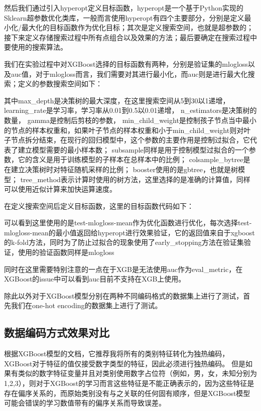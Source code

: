 然后我们通过引入hyperopt定义目标函数，hyperopt是一个基于Python实现的Sklearn超参数优化类库，一般而言使用hyperopt有四个主要部分，分别是定义最小化/最大化的目标函数作为优化目标；其次是定义搜索空间，也就是超参数的；接下来定义存储搜索过程中所有点组合以及效果的方法；最后要确定在搜索过程中要使用的搜索算法。

我们在实验过程中对XGBoost选择的目标函数有两种，分别是验证集的mlogloss以及auc值，对于mlogloss而言，我们需要对其进行最小化，而auc则是进行最大化搜索；定义的参数搜索空间如下：




其中max\_depth是决策树的最大深度，在这里搜索空间从5到30以1递增，
learning\_rate是学习率，学习率从0.01到0.5以0.01递增，
n\_estimators是决策树的数量，
gamma是控制后剪枝的参数，
min\_child\_weight是控制孩子节点当中最小的节点的样本权重和，如果叶子节点的样本权重和小于min\_child\_weight则对叶子节点拆分结束，在现行的回归模型中，这个参数的主要作用是控制过拟合，它代表了建立模型需要的最小样本数；
subsample同样是用于控制模型过拟合的一个参数，它的含义是用于训练模型的子样本在总样本中的比例；
colsample\_bytree是在建立决策树时对特征随机采样的比例；
booster使用的是gbtree，也就是树模型；
tree\_method表示计算时使用的树方法，这里选择的是准确的计算值，同样可以使用近似计算来加快运算速度。

在定义搜索空间后定义目标函数，这里的目标函数代码如下：




可以看到这里使用的是test-mlogloss-mean作为优化函数进行优化，每次选择test-mlogloss-mean的最小值返回给hyperopt进行效果验证，它的返回值来自于xgboost的k-fold方法，同时为了防止过拟合的现象使用了early\_stopping方法在验证集验证，使用的验证函数同样是mlogloss

同时在这里需要特别注意的一点在于XGB是无法使用auc作为eval\_metric，在XGBoost的issue中可以看到auc目前不支持在XGB上使用。

除此以外对于XGBoost模型分别在两种不同编码格式的数据集上进行了测试，首先我们在one-hot encoding的数据集上进行了测试。

\subsection{数据编码方式效果对比}

根据XGBoost模型的文档，它推荐我将所有的类别特征转化为独热编码，XGBoost对于特征的值仅接受数字类型的特征，因此必须进行独热编码。 但是如果有类似的数字特征变量并且对类别使用数字占位符（例如，{男，女，未知}分别为{1,2,3}），则对于XGBoost的学习而言这些特征是不能正确表示的，因为这些特征是存在偏序关系的，而原始类别没有与之关联的任何固有顺序，但是XGBoost模型可能会错误的学习数值带有的偏序关系而导致误差。

